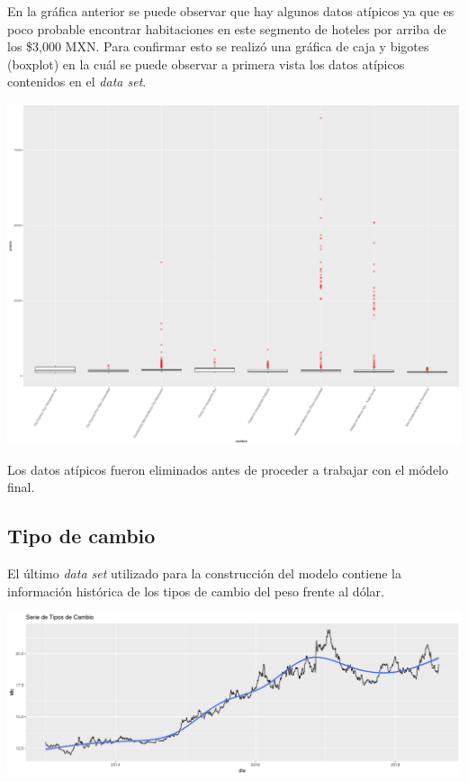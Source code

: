 En la gráfica anterior se puede observar que hay algunos datos atípicos ya que es poco probable encontrar habitaciones en este segmento de hoteles por arriba de los \$3,000 MXN. Para confirmar esto se realizó una gráfica de caja y bigotes (boxplot) en la cuál se puede observar a primera vista los datos atípicos contenidos en el \emph{data set}.

\color{fgcolor}
\includegraphics[width=\maxwidth]{figures/PreciosBoxPlot-1} 

Los datos atípicos fueron eliminados antes de proceder a trabajar con el módelo final.

\subsection*{Tipo de cambio}

El último \emph{data set} utilizado para la construcción del modelo contiene la información histórica de los tipos de cambio del peso frente al dólar.

\color{fgcolor}
\includegraphics[width=\maxwidth]{figures/TiposdeCambio-1} 

